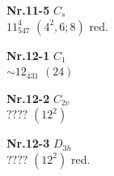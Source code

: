 \documentclass[12pt]{article}
\begin{document}
{\begin{minipage}[t]{3.5cm}
\centering
\epsfxsize=2.5cm
\par
{{\bf Nr.11-5} \quad $C_{s}$\\ $11^4_{547}$ \quad $(4^2,6;8)$ red.\\\vspace{3mm} }
\end{minipage}
\setlength{\unitlength}{1cm}
\begin{minipage}[t]{3.5cm}
\centering
\epsfxsize=2.5cm
\par
{{\bf Nr.12-1} \quad $C_{1}$\\  $\sim 12_{431}$ \quad $(24)$\\\vspace{3mm} }
\end{minipage}
\setlength{\unitlength}{1cm}
\begin{minipage}[t]{3.5cm}
\centering
\epsfxsize=2.5cm
\par
{{\bf Nr.12-2} \quad $C_{2v}$\\ $????$ \quad $(12^2)$\\\vspace{3mm} }
\end{minipage}
\setlength{\unitlength}{1cm}
\begin{minipage}[t]{3.5cm}
\centering
\epsfxsize=2.5cm
\par
{{\bf Nr.12-3} \quad $D_{3h}$\\ $????$ \quad $(12^2)$ red.\\\vspace{3mm} }
\end{minipage}
}
\end{document}

